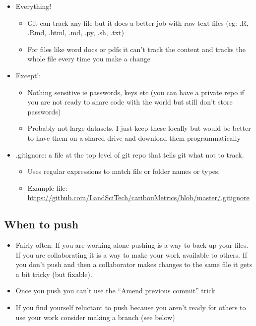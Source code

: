 \documentclass[
  letterpaper,
  DIV=11,
  numbers=noendperiod]{scrreprt}
\providecommand{\tightlist}{%
  \setlength{\itemsep}{0pt}\setlength{\parskip}{0pt}}\usepackage{longtable,booktabs,array}
\begin{document}
\begin{itemize}
\tightlist
\item
  Everything!

  \begin{itemize}
  \tightlist
  \item
    Git can track any file but it does a better job with raw text files
    (eg: .R, .Rmd, .html, .md, .py, .sh, .txt)
  \item
    For files like word docs or pdfs it can't track the content and
    tracks the whole file every time you make a change
  \end{itemize}
\item
  Except!:

  \begin{itemize}
  \tightlist
  \item
    Nothing sensitive ie passwords, keys etc (you can have a private
    repo if you are not ready to share code with the world but still
    don't store passwords)
  \item
    Probably not large datasets. I just keep these locally but would be
    better to have them on a shared drive and download them
    programmatically
  \end{itemize}
\item
  .gitignore: a file at the top level of git repo that tells git what
  not to track.

  \begin{itemize}
  \tightlist
  \item
    Uses regular expressions to match file or folder names or types.
  \item
    Example file:
    \url{https://github.com/LandSciTech/caribouMetrics/blob/master/.gitignore}
  \end{itemize}
\end{itemize}

\hypertarget{when-to-push}{%
\subsection{When to push}\label{when-to-push}}

\begin{itemize}
\tightlist
\item
  Fairly often. If you are working alone pushing is a way to back up
  your files. If you are collaborating it is a way to make your work
  available to others. If you don't push and then a collaborator makes
  changes to the same file it gets a bit tricky (but fixable).
\item
  Once you push you can't use the ``Amend previous commit'' trick
\item
  If you find yourself reluctant to push because you aren't ready for
  others to use your work consider making a branch (see below)
\end{itemize}
\end{document}

